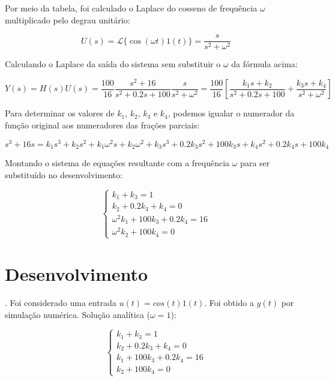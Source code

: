 \documentclass[10pt]{article}
\begin{document}
\quad Por meio da tabela, foi calculado o Laplace do cosseno de frequência $\omega$ multiplicado pelo degrau unitário:

\begin{equation}
    U(s) = \mathcal{L}\{ \cos(\omega t) 1(t) \} = \frac{s}{s^2 + \omega^2}
\end{equation}

\quad Calculando o Laplace da saída do sistema sem substituir o $\omega$ da fórmula acima:

\begin{equation}
    Y(s) = H(s)U(s) = \frac{100}{16} \frac{s^2 + 16}{s^2 + 0.2s + 100} \frac{s}{s^2 + \omega^2} = \frac{100}{16} \left[ \frac{k_1s + k_2}{s^2 + 0.2s + 100} + \frac{k_3s + k_4}{s^2 + \omega^2} \right] 
\end{equation}

\quad Para determinar os valores de $k_1$, $k_2$, $k_3$ e $k_4$, podemos igualar o numerador da função original aos numeradores das frações parciais:

\begin{equation}
    s^3 + 16s = k_1s^3 + k_2s^2 + k_1\omega^2 s + k_2\omega^2 + k_3s^3 + 0.2k_3s^2 + 100k_3s + k_4s^2 + 0.2k_4s + 100k_4
\end{equation}

\quad Montando o sistema de equações resultante com a frequência $\omega$ para ser substituído no desenvolvimento:

\begin{equation}
    \left\{
    \begin{array}{l}
        k_1 + k_3 = 1 \\
        k_2 + 0.2k_3 +k_4 = 0 \\
        \omega^2k_1 + 100k_3 + 0.2k_4 = 16 \\
        \omega^2k_2 + 100k_4 = 0
    \end{array}
    \right. 
\end{equation}

\newpage

\section{Desenvolvimento}

. Foi considerado uma entrada $u(t) = cos(t) 1(t)$. Foi obtido a $y(t)$ por simulação numérica. Solução analítica ($\omega = 1$):

\begin{equation}
    \left\{
    \begin{array}{l}
        k_1 + k_3 = 1 \\
        k_2 + 0.2k_3 +k_4 = 0 \\
        k_1 + 100k_3 + 0.2k_4 = 16 \\
        k_2 + 100k_4 = 0
    \end{array}
    \right. 
\end{equation}
\end{document}
